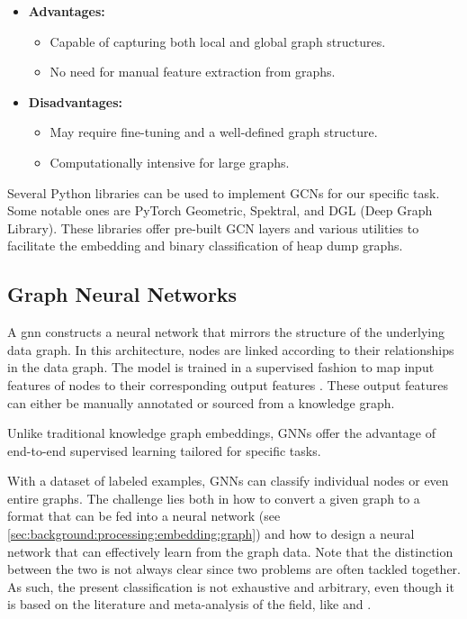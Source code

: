     \begin{itemize}
        \item \textbf{Advantages:}
        \begin{itemize}
            \item Capable of capturing both local and global graph structures.
            \item No need for manual feature extraction from graphs.
        \end{itemize}
        \item \textbf{Disadvantages:}
        \begin{itemize}
            \item May require fine-tuning and a well-defined graph structure.
            \item Computationally intensive for large graphs.
        \end{itemize}
    \end{itemize}

    Several Python libraries can be used to implement GCNs for our specific task. Some notable ones are PyTorch Geometric, Spektral, and DGL (Deep Graph Library). These libraries offer pre-built GCN layers and various utilities to facilitate the embedding and binary classification of heap dump graphs.

    \subsection{Graph Neural Networks}
    A \acrfull{gnn} constructs a neural network that mirrors the structure of the underlying data graph. In this architecture, nodes are linked according to their relationships in the data graph. The model is trained in a supervised fashion to map input features of nodes to their corresponding output features \cite{KG22}. These output features can either be manually annotated or sourced from a knowledge graph. 

    Unlike traditional knowledge graph embeddings, GNNs offer the advantage of end-to-end supervised learning tailored for specific tasks. 
    
    With a dataset of labeled examples, GNNs can classify individual nodes or even entire graphs. The challenge lies both in how to convert a given graph to a format that can be fed into a neural network (see \ref{sec:background:processing:embedding:graph}) and how to design a neural network that can effectively learn from the graph data. Note that the distinction between the two is not always clear since two problems are often tackled together. As such, the present classification is not exhaustive and arbitrary, even though it is based on the literature and meta-analysis of the field, like  \cite{KG22} and  \cite{GNNComprehensiveSurvey20}.
    
